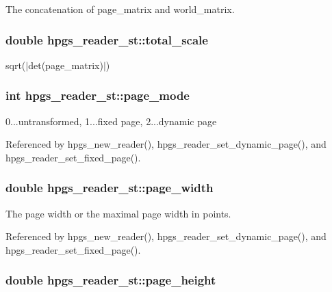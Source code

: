 The concatenation of page\_\-matrix and world\_\-matrix. 
\subsubsection[total\_\-scale]{\setlength{\rightskip}{0pt plus 5cm}double {\bf hpgs\_\-reader\_\-st::total\_\-scale}}\label{structhpgs__reader__st_02296e6401684131d808245dae6bc32b}


sqrt($|$det(page\_\-matrix)$|$) 
\subsubsection[page\_\-mode]{\setlength{\rightskip}{0pt plus 5cm}int {\bf hpgs\_\-reader\_\-st::page\_\-mode}}\label{structhpgs__reader__st_79244f4b44844514bce58c3ce48d4aa1}


0...untransformed, 1...fixed page, 2...dynamic page 

Referenced by hpgs\_\-new\_\-reader(), hpgs\_\-reader\_\-set\_\-dynamic\_\-page(), and hpgs\_\-reader\_\-set\_\-fixed\_\-page().
\subsubsection[page\_\-width]{\setlength{\rightskip}{0pt plus 5cm}double {\bf hpgs\_\-reader\_\-st::page\_\-width}}\label{structhpgs__reader__st_f35c4d1eece0d47f368a8c373cc36b8b}


The page width or the maximal page width in points. 

Referenced by hpgs\_\-new\_\-reader(), hpgs\_\-reader\_\-set\_\-dynamic\_\-page(), and hpgs\_\-reader\_\-set\_\-fixed\_\-page().
\subsubsection[page\_\-height]{\setlength{\rightskip}{0pt plus 5cm}double {\bf hpgs\_\-reader\_\-st::page\_\-height}}\label{structhpgs__reader__st_fb8ffce6da9c89b402445c858d0d8104}


